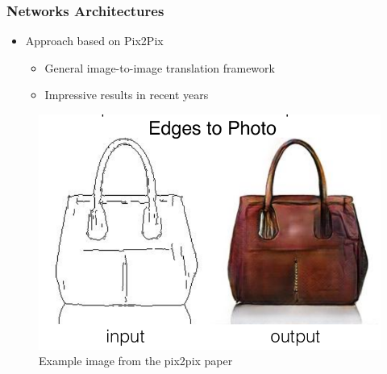 \documentclass[18pt]{beamer}
\begin{document}
\begin{frame}[t]
  \frametitle{Networks Architectures}
  \begin{itemize}
  \item Approach based on Pix2Pix\footnotemark
    \begin{itemize}
    \item General image-to-image translation framework
    \item Impressive results in recent years
    \end{itemize}
  \end{itemize}

  \begin{center}
    \begin{figure}[htb]
      \includegraphics[scale=0.23]{images/pix2pix_example}
      \caption{Example image from the pix2pix paper}
    \end{figure}  
  \end{center}

\end{frame}
\end{document}
